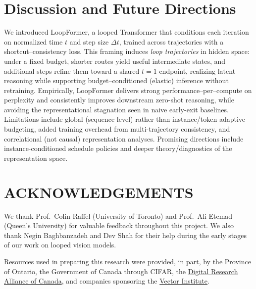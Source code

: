 
\section{Discussion and Future Directions}

\noindent We introduced LoopFormer, a looped Transformer that conditions each iteration on normalized time $t$ and step size $\Delta t$, trained across trajectories with a shortcut–consistency loss. This framing induces \emph{loop trajectories} in hidden space: under a fixed budget, shorter routes yield useful intermediate states, and additional steps refine them toward a shared $t{=}1$ endpoint, realizing latent reasoning while supporting budget–conditioned (elastic) inference without retraining. Empirically, LoopFormer delivers strong performance–per–compute on perplexity and consistently improves downstream zero-shot reasoning, while avoiding the representational stagnation seen in naive early-exit baselines. Limitations include global (sequence-level) rather than instance/token-adaptive budgeting, added training overhead from multi-trajectory consistency, and correlational (not causal) representation analyses. Promising directions include instance-conditioned schedule policies and deeper theory/diagnostics of the representation space.


\section{ACKNOWLEDGEMENTS}

\noindent We thank Prof.~Colin Raffel (University of Toronto) and Prof.~Ali Etemad (Queen's University) for valuable feedback throughout this project. We also thank Negin Baghbanzadeh and Dev Shah for their help during the early stages of our work on looped vision models.


\noindent Resources used in preparing this research were provided, in part, by the Province of Ontario, the Government of Canada through CIFAR, the \href{https://www.alliancecan.ca}{Digital Research Alliance of Canada}, and companies sponsoring the \href{https://www.vectorinstitute.ai/partnerships/current-partners/}{Vector Institute}.
